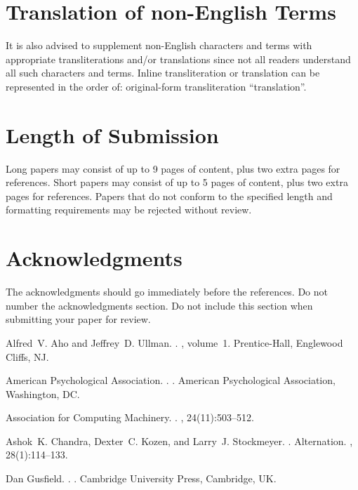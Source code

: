 \documentclass[11pt]{article}
\begin{document}
\section{Translation of non-English Terms}

It is also advised to supplement non-English characters and terms
with appropriate transliterations and/or translations
since not all readers understand all such characters and terms.
Inline transliteration or translation can be represented in
the order of: original-form transliteration ``translation''.

\section{Length of Submission}
\label{sec:length}

Long papers may consist of up to 9 pages of content, plus two extra
pages for references. Short papers may consist of up to 5 pages of
content, plus two extra pages for references.  Papers that do not
conform to the specified length and formatting requirements may be
rejected without review.



\section*{Acknowledgments}

The acknowledgments should go immediately before the references.  Do
not number the acknowledgments section. Do not include this section
when submitting your paper for review.

%
%

\begin{thebibliography}{}

Alfred~V. Aho and Jeffrey~D. Ullman.
.
, volume~1.
\newblock Prentice-{Hall}, Englewood Cliffs, NJ.

{American Psychological Association}.
.
.
\newblock American Psychological Association, Washington, DC.

{Association for Computing Machinery}.
.
, 24(11):503--512.

Ashok~K. Chandra, Dexter~C. Kozen, and Larry~J. Stockmeyer.
.
\newblock Alternation.
,
  28(1):114--133.

Dan Gusfield.
.
.
\newblock Cambridge University Press, Cambridge, UK.

\end{thebibliography}
\end{document}
